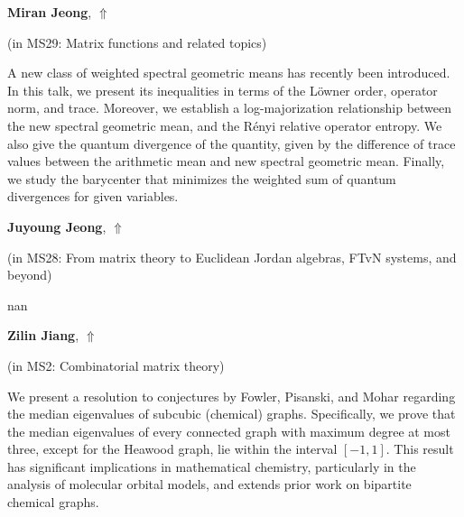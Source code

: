 \documentclass[ILAS2025-program.tex]{subfiles}
\begin{document}
     \hypertarget{down0123}{}\begin{ilasabstract}
    
    \textbf{Miran Jeong},  \hfill \hyperlink{up0123}{$\Uparrow$}
    
    (in {\color{mstitle}MS29: Matrix functions and related topics})
        
        \mtskip
    A new class of weighted spectral geometric means has recently been introduced. In this talk, we present its inequalities in terms of the L\"{o}wner order, operator
norm, and trace.
Moreover, we establish a log-majorization relationship between the new spectral geometric mean, and the R\'{e}nyi relative operator entropy.
We also give the quantum divergence of the quantity, given by the difference of trace values between the
arithmetic mean and new spectral geometric mean.
Finally, we study the barycenter that minimizes the weighted sum of quantum divergences for given variables.
\end{ilasabstract}
     \hypertarget{down0383}{}\begin{ilasabstract}
    
    \textbf{Juyoung Jeong},  \hfill \hyperlink{up0383}{$\Uparrow$}
    
    (in {\color{mstitle}MS28: From matrix theory to Euclidean Jordan algebras, FTvN systems, and beyond})
        
        \mtskip
    nan\end{ilasabstract}
     \hypertarget{down0033}{}\begin{ilasabstract}
    
    \textbf{Zilin Jiang},  \hfill \hyperlink{up0033}{$\Uparrow$}
    
    (in {\color{mstitle}MS2: Combinatorial matrix theory})
        
        \mtskip
    We present a resolution to conjectures by Fowler, Pisanski, and Mohar regarding the median eigenvalues of subcubic (chemical) graphs. Specifically, we prove that the median eigenvalues of every connected graph with maximum degree at most three, except for the Heawood graph, lie within the interval $[-1, 1]$. This result has significant implications in mathematical chemistry, particularly in the analysis of molecular orbital models, and extends prior work on bipartite chemical graphs.
\end{ilasabstract}
\end{document}
